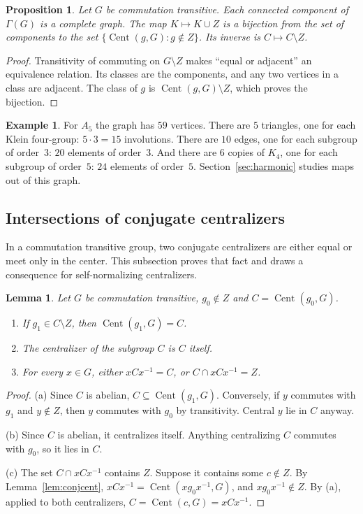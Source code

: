 \documentclass[12pt,letterpaper]{article}
\numberwithin{equation}{section}
\theoremstyle{plain}
\newtheorem{proposition}[theorem]{Proposition}
\newtheorem{lemma}[theorem]{Lemma}
\theoremstyle{definition}
\newtheorem{example}[theorem]{Example}
\DeclareMathOperator{\Cent}{Cent}
\begin{document}
\begin{proposition}\label{prop:graph}
Let $G$ be commutation transitive. Each connected component of $\Gamma(G)$
is a complete graph. The map $K\mapsto K\cup Z$ is a bijection from the set
of components to the set $\{\Cent(g,G): g\notin Z\}$. Its inverse is
$C\mapsto C\setminus Z$.
\end{proposition}

\begin{proof}
Transitivity of commuting on $G\setminus Z$ makes ``equal or adjacent'' an
equivalence relation. Its classes are the components, and any two vertices
in a class are adjacent. The class of $g$ is $\Cent(g,G)\setminus Z$, which
proves the bijection.
\end{proof}

\begin{example}\label{ex:a5graph}
For $A_5$ the graph has $59$ vertices. There are $5$ triangles, one for each
Klein four-group: $5\cdot3=15$ involutions. There are $10$ edges, one for
each subgroup of order~$3$: $20$ elements of order~$3$. And there are $6$
copies of $K_4$, one for each subgroup of order~$5$: $24$ elements of
order~$5$. Section~\ref{sec:harmonic} studies maps out of this graph.
\end{example}

\subsection{Intersections of conjugate centralizers}\label{sec:malnormal}

In a commutation transitive group, two conjugate centralizers are either
equal or meet only in the center. This subsection proves that fact and draws
a consequence for self-normalizing centralizers.

\begin{lemma}\label{lem:cent}
Let $G$ be commutation transitive, $g_0\notin Z$ and $C=\Cent(g_0,G)$.
\begin{enumerate}[label=(\alph*),itemsep=1pt]
\item If $g_1\in C\setminus Z$, then $\Cent(g_1,G)=C$.
\item The centralizer of the subgroup $C$ is $C$ itself.
\item For every $x\in G$, either $xCx^{-1}=C$, or $C\cap xCx^{-1}=Z$.
\end{enumerate}
\end{lemma}

\begin{proof}
(a) Since $C$ is abelian, $C\subseteq\Cent(g_1,G)$. Conversely, if $y$
commutes with $g_1$ and $y\notin Z$, then $y$ commutes with $g_0$ by
transitivity. Central $y$ lie in $C$ anyway.

(b) Since $C$ is abelian, it centralizes itself. Anything centralizing $C$
commutes with $g_0$, so it lies in $C$.

(c) The set $C\cap xCx^{-1}$ contains $Z$. Suppose it contains some
$c\notin Z$. By Lemma~\ref{lem:conjcent}, $xCx^{-1}=\Cent(xg_0x^{-1},G)$,
and $xg_0x^{-1}\notin Z$. By (a), applied to both centralizers,
$C=\Cent(c,G)=xCx^{-1}$.
\end{proof}
\end{document}
